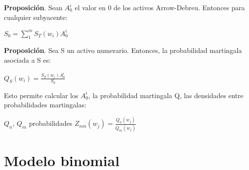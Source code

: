 \documentclass[
10pt, %
a4paper, %
oneside, %
headinclude,footinclude, %
BCOR5mm, %
]{scrartcl}
\newcommand{\n}[1]{\textbf{#1}}
\newcommand{\sub}[1]{_{#1}}
\newcommand{\pot}[1]{^{#1}}
\newcommand{\f}[1]{{\large{${#1}$}}}
\newcommand{\sumatorio}[2]{\sum_{#1}^{#2}}
\newcounter{ex}
\begin{document}
			\n{Proposición}. Sean \f{A\sub{0}\pot{i}} el valor en \f{0} de los activos Arrow-Debreu. Entonces para cualquier subyacente:
			\begin{center} \f{S\sub{0} = \sumatorio{1}{m} S\sub{T}(w\sub{i})A\sub{0}\pot{i}} \end{center}

			\n{Proposición}. Sea S un activo numerario. Entonces, la probabilidad martingala asociada a S es:
			\begin{center} \f{Q\sub{S}(w\sub{i}) = \frac{S\sub{T}(w\sub{i}) A\sub{0}\pot{i}}{S\sub{0}}} \end{center}

			Esto permite calcular los \f{A\sub{0}\pot{i}}, la probabilidad martingala Q, las densidades entre probabilidades martingalas: 
			\begin{center} \f{Q\sub{n}}, \f{Q\sub{m}} probabilidades \f{Z\sub{nm}(w\sub{j}) = \frac{Q\sub{n}(w\sub{j})}{Q\sub{m}(w\sub{j})}} \end{center}

	\newpage

	\section{Modelo binomial}
\end{document}
